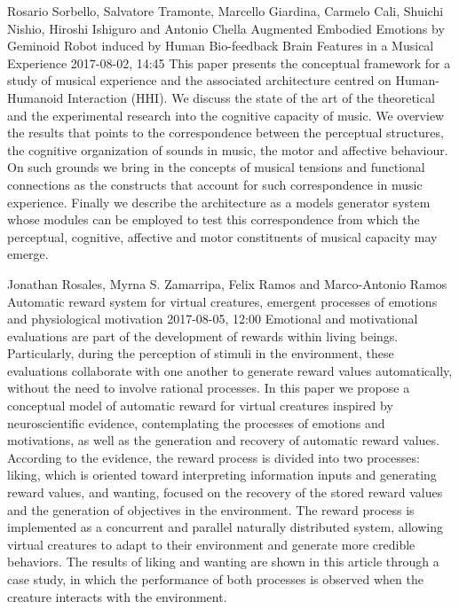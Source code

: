 \documentclass[10pt,fleqn,openany]{book} %
\begin{document}
\begin{enumerate}
		
		\paperabstract
		{Rosario Sorbello, Salvatore Tramonte, Marcello Giardina, Carmelo Cali, Shuichi Nishio, Hiroshi Ishiguro and Antonio Chella}
		{Augmented Embodied Emotions by Geminoid Robot induced by Human Bio-feedback Brain Features in a Musical Experience}
		{2017-08-02, 14:45}
		{This paper presents the conceptual framework for a study of musical experience and the associated architecture centred on Human-Humanoid Interaction (HHI). We discuss the state of the art of the theoretical and the experimental research into the cognitive capacity of music. We overview the results that points  to the correspondence between the perceptual structures, the cognitive organization of sounds in music, the motor and affective behaviour. On such grounds we bring in the concepts of musical tensions and functional connections as the constructs that account for such correspondence in music experience. Finally we describe the architecture as a models generator system whose  modules can be employed to test this correspondence from which the perceptual, cognitive, affective and motor constituents of musical capacity may emerge.}
		
		
		\paperabstract
		{Jonathan Rosales, Myrna S. Zamarripa, Felix Ramos and Marco-Antonio Ramos}
		{Automatic reward system for virtual creatures, emergent processes of emotions and physiological motivation}
		{2017-08-05, 12:00}
		{Emotional and motivational evaluations are part of the development of rewards within living beings. Particularly, during the perception of stimuli in the environment, these evaluations collaborate with one another to generate reward values automatically, without the need to involve rational processes. In this paper we propose a conceptual model of automatic reward for virtual creatures inspired by neuroscientific evidence, contemplating the processes of emotions and motivations, as well as the generation and recovery of automatic reward values. According to the evidence, the reward process is divided into two processes: liking, which is oriented toward interpreting information inputs and generating reward values, and wanting, focused on the recovery of the stored reward values and the generation of objectives in the environment. The reward process is implemented as a concurrent and parallel naturally distributed system, allowing virtual creatures to adapt to their environment and generate more credible behaviors. The results of liking and wanting are shown in this article through a case study, in which the performance of both processes is observed when the creature interacts with the environment.}
		

\end{enumerate}
\end{document}
